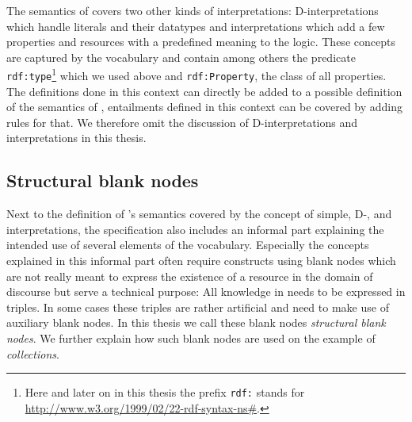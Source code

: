 %  
The semantics of  \rdf covers two other kinds of interpretations: D-interpretations which handle literals and their datatypes and \rdf interpretations 
which add a few properties and resources with a predefined meaning to the logic. These concepts are captured by the \rdf vocabulary and contain among others the predicate 
\texttt{rdf:type}\footnote{Here and later on in this thesis the prefix \texttt{rdf:} stands for  \url{http://www.w3.org/1999/02/22-rdf-syntax-ns\#}. } which we used above and 
\texttt{rdf:Property}, the class of all properties. 
% 
The definitions done in this context can directly be added to a 
possible definition of the semantics of \nthree, entailments defined in this context can be covered by adding rules for that. 
%
We therefore omit the discussion of D-interpretations and \rdf interpretations in this thesis.

\subsection{Structural blank nodes}\label{strucblanks}
Next to the definition of \rdf's semantics covered by the concept of simple, D-, and \rdf interpretations, 
the \rdf specification also includes an informal part explaining the intended use of several elements of the \rdf vocabulary. 
Especially %
the concepts explained in this informal part often require constructs using blank nodes which are not really 
meant to express the existence of a resource in the domain of discourse but 
serve a technical purpose: All knowledge in \rdf needs to be expressed in triples. In some cases these triples are rather artificial and 
need to make use of auxiliary blank nodes. In this thesis we call these blank nodes \emph{structural blank nodes}. 
We further explain how such blank nodes are used on the example of \emph{\rdf collections}. 

